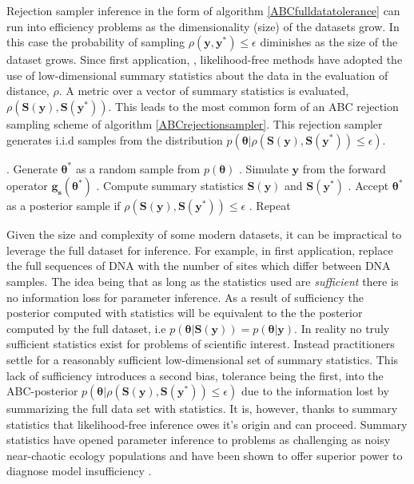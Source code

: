 Rejection sampler inference in the form of algorithm \ref{ABCfulldatatolerance} can run into efficiency problems as the dimensionality (size) of the datasets grow. In this case the probability of sampling $\rho(\bm{y},\bm{y^*})\leq\epsilon$ diminishes as the size of the dataset grows. Since first application, \citet{Tavare1997}, likelihood-free methods have adopted the use of low-dimensional summary statistics about the data in the evaluation of distance, $\rho$. A metric over a vector of summary statistics is evaluated, $\rho(\bm{S}(\bm{y}),\bm{S}(\bm{y^*}))$. This leads to the most common form of an ABC rejection sampling scheme of algorithm \ref{ABCrejectionsampler}. This rejection sampler generates i.i.d samples from the distribution $p(\bm{\theta}|\rho(\bm{S}(\bm{y}),\bm{S}(\bm{y^*}))\leq\epsilon)$.

\begin{algorithm}[H]
	\caption{ }
	\begin{algorithmic}
		. Generate $\bm{\theta^*}$ as a random sample from $p(\bm{\theta})$		
		. Simulate $\bm{y}$ from the forward operator $\bm{g_s}(\bm{\theta^*})$		
		. Compute summary statistics $\bm{S}(\bm{y})$ and $\bm{S}(\bm{y^*})$		
		. Accept $\bm{\theta^*}$ as a posterior sample if $\rho(\bm{S}(\bm{y}),\bm{S}(\bm{y^*}))\leq\epsilon$		
		. Repeat
	\end{algorithmic}
	\label{ABCrejectionsampler}
\end{algorithm}

Given the size and complexity of some modern datasets, it can be impractical to leverage the full dataset for inference. For example, in first application, \citet{Tavare1997} replace the full sequences of DNA with the number of sites which differ between DNA samples. The idea being that as long as the statistics used are \textit{sufficient} there is no information loss for parameter inference. As a result of sufficiency the posterior computed with statistics will be equivalent to the the posterior computed by the full dataset, i.e $p(\bm{\theta}|\bm{S}(\bm{y})) = p(\bm{\theta}|\bm{y})$. In reality no truly sufficient statistics exist for problems of scientific interest. Instead practitioners settle for a reasonably sufficient low-dimensional set of summary statistics. This lack of sufficiency introduces a second bias, tolerance being the first, into the ABC-posterior $p(\bm{\theta}|\rho(\bm{S}(\bm{y}),\bm{S}(\bm{y^*}))\leq\epsilon)$ due to the information lost by summarizing the full data set with statistics. It is, however, thanks to summary statistics that likelihood-free inference owes it's origin and can proceed. Summary statistics have opened parameter inference to problems as challenging as noisy near-chaotic ecology populations \citep{Wood2010} and have been shown to offer superior power to diagnose model insufficiency \citep{Ratmann2009,vrugt2013toward}.\\

